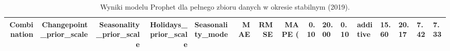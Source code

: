\begin{table}
\caption{Wyniki modelu Prophet dla pełnego zbioru danych w okresie stabilnym (2019).}
\label{tab:prophet_results_full_stable}
\begin{tabular}{rrrrlrrrr}
\toprule
Combination & Changepoint_prior_scale & Seasonality_prior_scale & Holidays_prior_scale & Seasonality_mode & MAE & RMSE & MAPE (%
 & 0.10 & 20.00 & 0.10 & additive & 15.60 & 20.17 & 7.42 & 7.33 \\
\bottomrule
\end{tabular}
\end{table}
